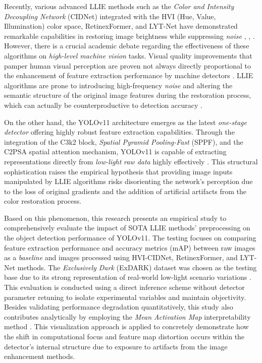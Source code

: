 \documentclass[conference]{IEEEtran}
\begin{document}
Recently, various advanced LLIE methods such as the \textit{Color and Intensity Decoupling Network} (CIDNet) integrated with the HVI (Hue, Value, Illumination) color space, RetinexFormer, and LYT-Net have demonstrated remarkable capabilities in restoring image brightness while suppressing \textit{noise} \cite{yan2025hvi}, \cite{cai2023retinexformer}, \cite{brateanu2025lytnet}. However, there is a crucial academic debate regarding the effectiveness of these algorithms on \textit{high-level machine vision} tasks. Visual quality improvements that pamper human visual perception are proven not always directly proportional to the enhancement of feature extraction performance by machine detectors \cite{wu2024llieeffect}. LLIE algorithms are prone to introducing high-frequency \textit{noise} and altering the semantic structure of the original image features during the restoration process, which can actually be counterproductive to detection accuracy \cite{wang2023yolov5lowlight}.

On the other hand, the YOLOv11 architecture emerges as the latest \textit{one-stage detector} offering highly robust feature extraction capabilities. Through the integration of the C3k2 block, \textit{Spatial Pyramid Pooling-Fast} (SPPF), and the C2PSA spatial attention mechanism, YOLOv11 is capable of extracting representations directly from \textit{low-light} \textit{raw data} highly effectively \cite{khanam2024yolov11}. This structural sophistication raises the empirical hypothesis that providing image inputs manipulated by LLIE algorithms risks disorienting the network's perception due to the loss of original gradients and the addition of artificial artifacts from the color restoration process.

Based on this phenomenon, this research presents an empirical study to comprehensively evaluate the impact of SOTA LLIE methods' preprocessing on the object detection performance of YOLOv11. The testing focuses on comparing feature extraction performance and accuracy metrics (mAP) between raw images as a \textit{baseline} and images processed using HVI-CIDNet, RetinexFormer, and LYT-Net methods. The \textit{Exclusively Dark} (ExDARK) dataset was chosen as the testing base due to its strong representation of real-world low-light scenario variations \cite{loh2019exdark}. This evaluation is conducted using a direct inference scheme without detector parameter retuning to isolate experimental variables and maintain objectivity. Besides validating performance degradation quantitatively, this study also contributes analytically by employing the \textit{Mean Activation Map} interpretability method \cite{metrics2026formulas}. This visualization approach is applied to concretely demonstrate how the shift in computational focus and feature map distortion occurs within the detector's internal structure due to exposure to artifacts from the image enhancement methods.
\end{document}
